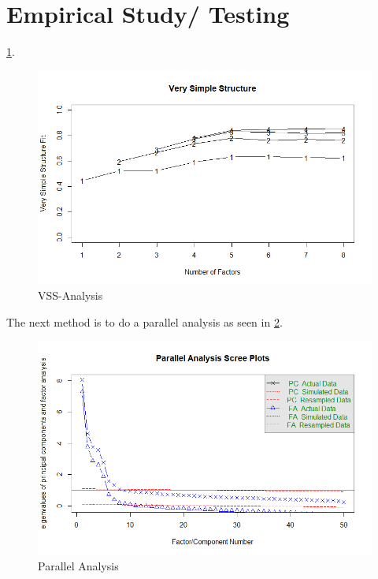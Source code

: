 \section{Empirical Study/ Testing}


\ref{Fig:VSS}. 
\begin{figure}[ht]
    \begin{center}
        \includegraphics[scale=0.5,angle=0]{Figures/VSS.png}
        \caption{VSS-Analysis}
        \label{Fig:VSS}
    \end{center}
\end{figure}
\newline
The next method is to do a parallel analysis as seen in \ref{Fig:Parallel}.
\begin{figure}[ht]
    \begin{center}
        \includegraphics[scale=0.5,angle=0]{Figures/ParallelAnalysis.png}
        \caption{Parallel Analysis}
        \label{Fig:Parallel}
    \end{center}
\end{figure}
\newline

